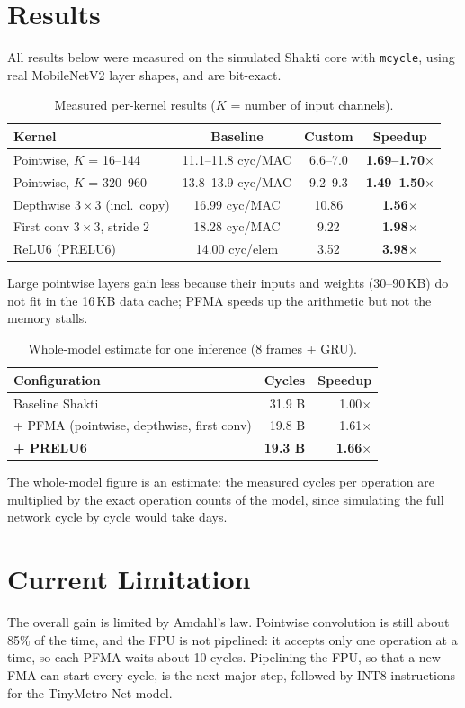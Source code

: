 \section{Results}

All results below were measured on the simulated Shakti core with
\texttt{mcycle}, using real MobileNetV2 layer shapes, and are bit-exact.

\begin{table}[h]
\centering
\begin{tabular}{lccc}\toprule
Kernel & Baseline & Custom & Speedup\\\midrule
Pointwise, $K$ = 16--144 & 11.1--11.8 cyc/MAC & 6.6--7.0 & \textbf{1.69--1.70$\times$}\\
Pointwise, $K$ = 320--960 & 13.8--13.9 cyc/MAC & 9.2--9.3 & \textbf{1.49--1.50$\times$}\\
Depthwise $3\times3$ (incl.\ copy) & 16.99 cyc/MAC & 10.86 & \textbf{1.56$\times$}\\
First conv $3\times3$, stride 2 & 18.28 cyc/MAC & 9.22 & \textbf{1.98$\times$}\\
ReLU6 (PRELU6) & 14.00 cyc/elem & 3.52 & \textbf{3.98$\times$}\\\bottomrule
\end{tabular}
\caption{Measured per-kernel results ($K$ = number of input channels).}
\end{table}

Large pointwise layers gain less because their inputs and weights
(30--90\,KB) do not fit in the 16\,KB data cache; PFMA speeds up the
arithmetic but not the memory stalls.

\begin{table}[h]
\centering
\begin{tabular}{lrr}\toprule
Configuration & Cycles & Speedup\\\midrule
Baseline Shakti & 31.9 B & 1.00$\times$\\
+ PFMA (pointwise, depthwise, first conv) & 19.8 B & 1.61$\times$\\
\textbf{+ PRELU6} & \textbf{19.3 B} & \textbf{1.66$\times$}\\\bottomrule
\end{tabular}
\caption{Whole-model estimate for one inference (8 frames + GRU).}
\end{table}

The whole-model figure is an estimate: the measured cycles per operation are
multiplied by the exact operation counts of the model, since simulating the
full network cycle by cycle would take days.

\section{Current Limitation}

The overall gain is limited by Amdahl's law. Pointwise convolution is still
about 85\% of the time, and the FPU is not pipelined: it accepts only one
operation at a time, so each PFMA waits about 10 cycles. Pipelining the FPU,
so that a new FMA can start every cycle, is the next major step, followed by
INT8 instructions for the TinyMetro-Net model.
